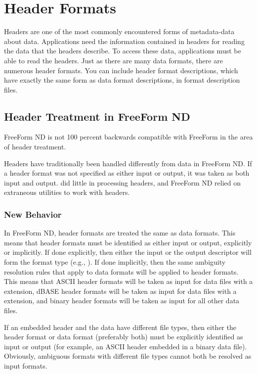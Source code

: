 %
%

\chapter{Header Formats}
\label{ff,hdrfmt}

Headers are one of the most commonly encountered forms of
metadata-data about data. Applications need the information contained
in headers for reading the data that the headers describe. To access
these data, applications must be able to read the headers. Just as
there are many data formats, there are numerous header formats. You
can include header format descriptions, which have exactly the same
form as data format descriptions, in format description files.

\section{Header Treatment in FreeForm ND}

FreeForm ND is not 100 percent backwards compatible with FreeForm in
the area of header treatment.

Headers have traditionally been handled differently from data in
FreeForm ND. If a header format was not specified as either input or
output, it was taken as both input and output.  did
little in processing headers, and FreeForm ND relied on extraneous
utilities to work with headers.

\subsection{New Behavior}

In FreeForm ND, header formats are treated the same as data formats.
This means that header formats must be identified as either input or
output, explicitly or implicitly. If done explicitly, then either the
input or the output descriptor will form the format type (e.g.,
). If done implicitly, then the same
ambiguity resolution rules that apply to data formats will be applied
to header formats. This means that ASCII header formats will be taken
as input for data files with a  extension, dBASE header
formats will be taken as input for data files with a 
extension, and binary header formats will be taken as input for all
other data files.

If an embedded header and the data have different file types, then
either the header format or data format (preferably both) must be
explicitly identified as input or output (for example, an ASCII header
embedded in a binary data file). Obviously, ambiguous formats with
different file types cannot both be resolved as input formats.

